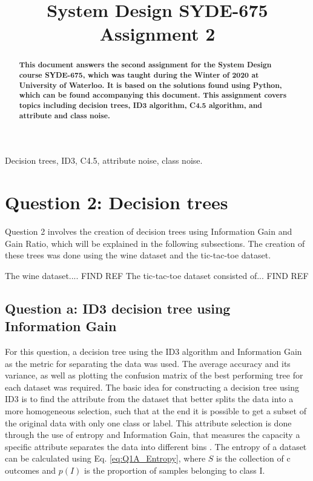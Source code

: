 \documentclass{article}
\title{System Design SYDE-675 Assignment 2}
\begin{document}
%
\maketitle

\begin{abstract}
\ninept
\textbf{
This document answers the second assignment for the System Design course SYDE-675, which was taught during the Winter of 2020 at University of Waterloo. It is based on the solutions found using Python, which can be found accompanying this document.
This assignment covers topics including decision trees, ID3 algorithm, C4.5 algorithm, and attribute and class noise.
} 
\end{abstract}
%
\begin{keywords}
\ninept
Decision trees, ID3, C4.5, attribute noise, class noise.
\end{keywords} 


\section{Question 2: Decision trees}
Question 2 involves the creation of decision trees using Information Gain and Gain Ratio, which will be explained in the following subsections. The creation of these trees was done using the wine dataset and the tic-tac-toe dataset.

The wine dataset.... FIND REF
The tic-tac-toe dataset consisted of... FIND REF

\subsection{Question a: ID3 decision tree using Information Gain}
\label{subsec:Q1A}
For this question, a decision tree using the ID3 algorithm and Information Gain as the metric for separating the data was used. The average accuracy and its variance, as well as plotting the confusion matrix of the best performing tree for each dataset was required.
The basic idea for constructing a decision tree using ID3 is to find the attribute from the dataset that better splits the data into a more homogeneous selection, such that at the end it is possible to get a subset of the original data with only one class or label. This attribute selection is done through the use of entropy and Information Gain, that measures the capacity a specific attribute separates the data into different bins \cite{ID3Algo}. The entropy of a dataset can be calculated using Eq. \ref{eq:Q1A_Entropy}, where $S$ is the collection of c outcomes and $p(I)$ is the proportion of samples belonging to class I.
\end{document}
